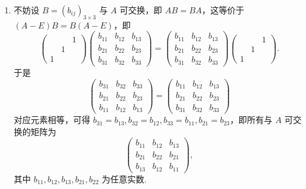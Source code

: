 \documentclass[12pt,fontset=fandol]{ctexart}
\begin{document}
\begin{solve}
\begin{enumerate}
                \item 不妨设 $ B = (b_{ij})_{3 \times 3} $ 与 $ A $ 可交换，即 $ AB = BA $，这等价于 $ (A - E)B = B(A - E) $，即
                      \[ \begin{pmatrix}
                                &   & 1 \\
                                & 1 &   \\
                              1 &   &
                          \end{pmatrix}
                          \begin{pmatrix}
                              b_{11} & b_{12} & b_{13} \\
                              b_{21} & b_{22} & b_{23} \\
                              b_{31} & b_{32} & b_{33}
                          \end{pmatrix} =
                          \begin{pmatrix}
                              b_{11} & b_{12} & b_{13} \\
                              b_{21} & b_{22} & b_{23} \\
                              b_{31} & b_{32} & b_{33}
                          \end{pmatrix}
                          \begin{pmatrix}
                                &   & 1 \\
                                & 1 &   \\
                              1 &   &
                          \end{pmatrix}. \]
                      于是
                      \[ \begin{pmatrix}
                              b_{31} & b_{32} & b_{33} \\
                              b_{21} & b_{22} & b_{23} \\
                              b_{11} & b_{12} & b_{13}
                          \end{pmatrix} = \begin{pmatrix}
                              b_{11} & b_{12} & b_{13} \\
                              b_{21} & b_{22} & b_{23} \\
                              b_{31} & b_{32} & b_{33}
                          \end{pmatrix} \]
                      对应元素相等，可得 $ b_{31} = b_{13}, b_{32} = b_{12}, b_{33} = b_{11}, b_{21} = b_{23} $，即所有与 $ A $ 可交换的矩阵为
                      \[ \begin{pmatrix}
                              b_{11} & b_{12} & b_{13} \\
                              b_{21} & b_{22} & b_{21} \\
                              b_{13} & b_{12} & b_{11}
                          \end{pmatrix}, \]
                      其中 $ b_{11}, b_{12}, b_{13}, b_{21}, b_{22} $ 为任意实数.


\end{enumerate}
\end{solve}
\end{document}
